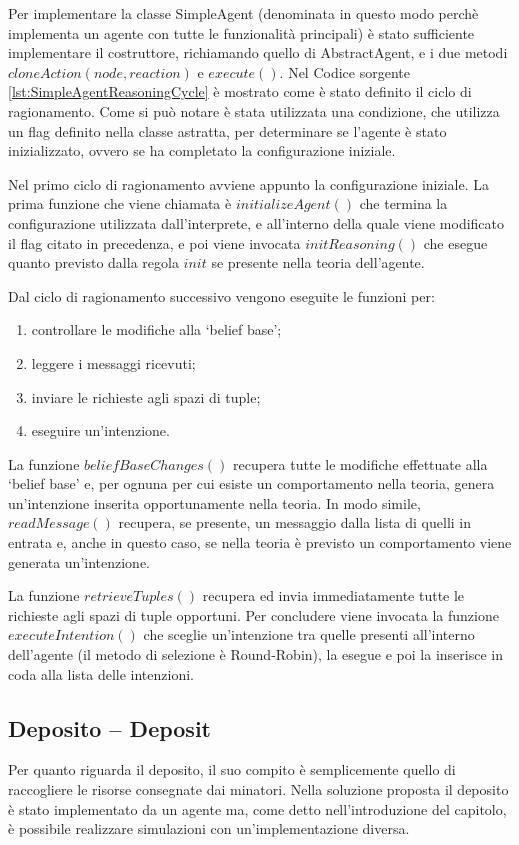 Per implementare la classe SimpleAgent (denominata in questo modo perchè implementa un agente con tutte le funzionalità principali) è stato sufficiente implementare il costruttore, richiamando quello di AbstractAgent, e i due metodi $cloneAction(node, reaction)$ e $execute()$.
Nel Codice sorgente \ref{lst:SimpleAgentReasoningCycle} è mostrato come è stato definito il ciclo di ragionamento.
Come si può notare è stata utilizzata una condizione, che utilizza un flag definito nella classe astratta, per determinare se l'agente è stato inizializzato, ovvero se ha completato la configurazione iniziale.

Nel primo ciclo di ragionamento avviene appunto la configurazione iniziale. La prima funzione che viene chiamata è $initializeAgent()$ che termina la configurazione utilizzata dall'interprete, e all'interno della quale viene modificato il flag citato in precedenza, e poi viene invocata $initReasoning()$ che esegue quanto previsto dalla regola $init$ se presente nella teoria dell'agente.

Dal ciclo di ragionamento successivo vengono eseguite le funzioni per:
\begin{enumerate}
\item controllare le modifiche alla `belief base';
\item leggere i messaggi ricevuti;
\item inviare le richieste agli spazi di tuple;
\item eseguire un'intenzione.
\end{enumerate}
La funzione $beliefBaseChanges()$ recupera tutte le modifiche effettuate alla `belief base' e, per ognuna per cui esiste un comportamento nella teoria, genera un'intenzione inserita opportunamente nella teoria. In modo simile, $readMessage()$ recupera, se presente, un messaggio dalla lista di quelli in entrata e, anche in questo caso, se nella teoria è previsto un comportamento viene generata un'intenzione.

La funzione $retrieveTuples()$ recupera ed invia immediatamente tutte le richieste agli spazi di tuple opportuni.
Per concludere viene invocata la funzione $executeIntention()$ che sceglie un'intenzione tra quelle presenti all'interno dell'agente (il metodo di selezione è Round-Robin), la esegue e poi la inserisce in coda alla lista delle intenzioni.

\subsection{Deposito -- Deposit}
Per quanto riguarda il deposito, il suo compito è semplicemente quello di raccogliere le risorse consegnate dai minatori.
Nella soluzione proposta il deposito è stato implementato da un agente ma, come detto nell'introduzione del capitolo, è possibile realizzare simulazioni con un'implementazione diversa.

